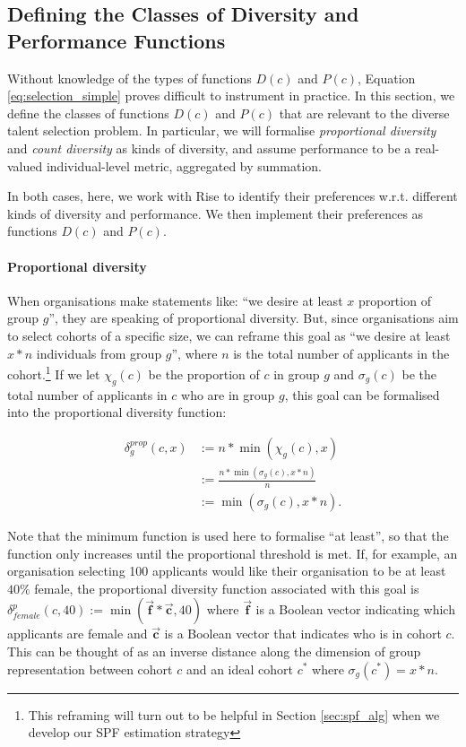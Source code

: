 \subsection{Defining the Classes of Diversity and Performance Functions}\label{subsubsec:div_talent_def}
Without knowledge of the types of functions $D(c)$ and $P(c)$, Equation \ref{eq:selection_simple} proves difficult to instrument in practice. In this section, we define the classes of functions $D(c)$ and $P(c)$ that are relevant to the diverse talent selection problem. In particular, we will formalise \emph{proportional diversity} and \emph{count diversity} as kinds of diversity, and assume performance to be a real-valued individual-level metric, aggregated by summation.

In both cases, here, we work with Rise to identify their preferences w.r.t. different kinds of diversity and performance. We then implement their preferences as functions $D(c)$ and $P(c)$.

\paragraph{Proportional diversity} When organisations make statements like: ``we desire at least $x$ proportion of group $g$'', they are speaking of proportional diversity. But, since organisations aim to select cohorts of a specific size, we can reframe this goal as ``we desire at least $x*n$ individuals from group $g$'', where $n$ is the total number of applicants in the cohort.\footnote{This reframing will turn out to be helpful in Section \ref{sec:spf_alg} when we develop our SPF estimation strategy} If we let $\chi_g(c)$ be the proportion of $c$ in group $g$ and $\sigma_g(c)$ be the total number of applicants in $c$ who are in group $g$, this goal can be formalised into the proportional diversity function:

\begin{equation}
    \begin{split}
        \delta_{g}^{prop}(c,x) &:= n*\min(\chi_g(c), x) \\
        & := \frac{n* \min(\sigma_g(c), x*n)}{n} \\ 
        & := \min(\sigma_g(c), x*n). \label{eq:prop_div_function}
    \end{split}
\end{equation}

Note that the minimum function is used here to formalise ``at least'', so that the function only increases until the proportional threshold is met. If, for example, an organisation selecting 100 applicants would like their organisation to be at least $40\%$ female, the proportional diversity function associated with this goal is $\delta_{female}^p(c, 40) := \min(\vec{\mathbf{f}}*\vec{\mathbf{c}}, 40)$ where $\vec{\mathbf{f}}$ is a Boolean vector indicating which applicants are female and $\vec{\mathbf{c}}$ is a Boolean vector that indicates who is in cohort $c$. This can be thought of as an inverse distance along the dimension of group representation between cohort $c$ and an ideal cohort $c^*$ where $\sigma_g(c^*) = x*n$.

